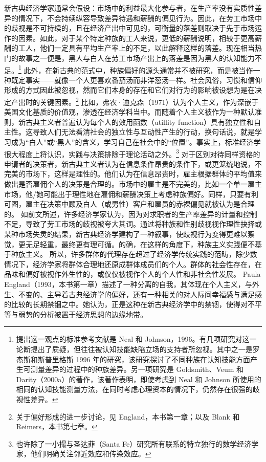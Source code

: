 \documentclass[UTF8]{ctexart}
\begin{document}
新古典经济学家通常会假设：市场中的利益最大化参与者，在生产率没有实质性差异的情况下，不会持续纵容导致差异待遇和薪酬的偏见行为。因此，在劳工市场中的歧视是不可持续的，且在经济产出中可见的，可衡量的落差则取决于先于市场运作的因素。如此，对于某个特定种族的工人来说，更低的薪酬说明，相较于更高薪酬的工人，他们一定具有平均生产率上的不足，以此解释这样的落差。现在相当热门的故事之一便是，黑人与白人在劳工市场产出上的落差是因为黑人的认知能力不足。\footnote[4]{提出这一观点的标准参考文献是 Neal 和 Johnson，1996。有几项研究对这一论断提出了质疑，但往往被认知技能缺陷立场的支持者所忽视。其中之一是罗杰斯和斯普里格斯 1996 年的研究，该研究探讨了不同种族在认知技能方面产生可测量差异的过程中的种族差异。另一项研究是 Goldsmith、Veum 和 Darity（2000a）的著作，该著作表明，即使考虑到 Neal 和 Johnson 所使用的相同的认知技能测量方法，在同时考虑心理资本的情况下，仍然存在很强的歧视性差异。}
此外，在新古典的范式中，种族偏好的源头通常并不被研究，而是被当作一种既定事实——就像一个人更喜欢番茄汤而非洋葱汤一样。社会风俗，习惯和信仰形成的方式因此被忽视，然而它们本身的存在和它们对行为的影响被设想为是在决定产出时的关键因素。\footnote[5]{关于偏好形成的进一步讨论，见 England，本书第一章；以及 Blank 和 Reimers，本书第七章。}
比如，弗农·迪克森（1971）认为个人主义，作为深嵌于美国文化基质的价值观，渗透在经济学科当中。而随着个人主义被作为一种默认准则，新古典主义者普遍认为每个人的效用函数（utillity function）具有独立性和自主性。这导致人们无法看清社会的独立性与互动性产生的行动，换句话说，就是学习成为“白人”或“黑人”的含义，学习自己在社会中的“位置”。事实上，标准经济学很大程度上将认识，实践与决策排除于理论活动之外。\footnote[6]{也许除了一小撮与圣达菲（Santa Fe）研究所有联系的特立独行的数学经济学家，他们明确关注邻近效应和传染效应。}
对于区别对待同样资格的申请者的决策者，新古典主义者认为在信息条件昂贵的条件下，或更笼统地说，不完美的市场下，这样是理性的。他们认为在信息昂贵时，雇主根据群体的平均值来做出是否雇佣个人的决策是合理的。市场中的雇主是不完美的，比如一个单一雇主市场，他/她可能出于理性地在雇佣和薪酬决策上考虑种族偏好。同样，只要有利可图，雇主在决策中顾及白人（或男性）客户和雇员的赤裸偏见就被认为是合理的。
如前文所述，许多经济学家认为，因为对求职者的生产率差异的计量和控制不足，导致了劳工市场的歧视被夸大其词。通过将种族和性别歧视视作理性抉择或某种市场失灵的结果，新古典经济学建构了一种叙事，使歧视行为变得更难以察觉，更无足轻重，最终更有理可循。的确，在这样的角度下，种族主义实践便不基于种族主义。
所以，许多群体的代理存在超过了经济学传统实践的范畴，除少数情况下，经济学家将群体合理地还原成群体成员们的个人。群体的社会性存在，在品味和偏好被视作外生性的，或仅仅被视作个人的个人性和非社会性发展。
Paula England（1993，本书第一章）描述了一种分离的自我，其体现在个人主义，与外生、不变的、主导着古典经济学的偏好，还有一种相关的对人际间幸福感与满足感的比较的长期禁锢之中。她认为，正是这种在新古典经济学中的禁锢，使得对不平等与弱势的分析被置于经济思想的边缘地带。
\end{document}
